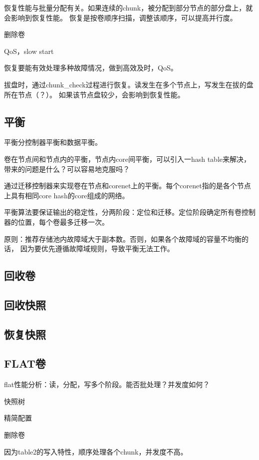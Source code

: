 恢复性能与批量分配有关。如果连续的chunk，被分配到部分节点的部分盘上，就会影响到恢复性能。
恢复是按卷顺序扫描，调整该顺序，可以提高并行度。

删除卷

QoS，slow start

恢复要能有效处理多种故障情况，做到高效及时，QoS。

拔盘时，通过chunk\_check过程进行恢复。读发生在多个节点上，写发生在拔的盘所在节点（？）。
如果该节点盘较少，会影响到恢复性能。

\subsection{平衡}

平衡分控制器平衡和数据平衡。

卷在节点间和节点内的平衡，节点内core间平衡，可以引入一hash table来解决，
带来的问题是什么？可以容易地克服吗？

通过迁移控制器来实现卷在节点和corenet上的平衡。每个corenet指的是各个节点上具有相同core hash的core组成的网络。

平衡算法要保证输出的稳定性，分两阶段：定位和迁移。定位阶段确定所有卷控制器的位置，每个卷最多迁移一次。

原则：推荐存储池内故障域大于副本数。否则，如果各个故障域的容量不均衡的话，
因为要优先遵循故障域规则，导致平衡无法工作。

\subsection{回收卷}

\subsection{回收快照}

\subsection{恢复快照}

\subsection{FLAT卷}

flat性能分析：读，分配，写多个阶段。能否批处理？并发度如何？

快照树

精简配置

删除卷

因为table2的写入特性，顺序处理各个chunk，并发度不高。

